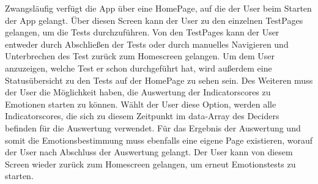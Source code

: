 Zwangsläufig verfügt die App über eine HomePage, auf die der User beim Starten der App gelangt. Über diesen Screen kann der User zu den einzelnen TestPages gelangen, um die Tests durchzuführen. Von den TestPages kann der User entweder durch Abschließen der Tests oder durch manuelles Navigieren und Unterbrechen des Test zurück zum Homescreen gelangen. Um dem User anzuzeigen, welche Test er schon durchgeführt hat, wird außerdem eine Statusübersicht zu den Tests auf der HomePage zu sehen sein. Des Weiteren muss der User die Möglichkeit haben, die Auswertung der Indicatorscores zu Emotionen starten zu können. Wählt der User diese Option, werden alle Indicatorscores, die sich zu diesem Zeitpunkt im data-Array des Deciders befinden für die Auswertung verwendet. \newline
Für das Ergebnis der Auswertung und somit die Emotionsbestimmung muss ebenfalls eine eigene Page existieren, worauf der User nach Abschluss der Auswertung gelangt. Der User kann von diesem Screen wieder zurück zum Homescreen gelangen, um erneut Emotionstests zu starten. 
